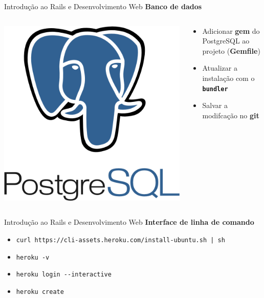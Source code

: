 \documentclass[10pt]{beamer}
\begin{document}
\begin{frame}{Introdução ao Rails e Desenvolvimento Web}
  \huge
  \textbf{Banco de dados}
  \vfill
  \begin{columns}
    \begin{column}{0.29\textwidth}
      \centering
      \includegraphics[width=\textwidth]{images/postgresql.png}
    \end{column}
    \begin{column}{0.69\textwidth}
      \large
      \begin{itemize}
        \item Adicionar \textbf{gem} do PostgreSQL ao projeto (\textbf{Gemfile})
        \item Atualizar a instalação com o \textbf{\texttt{bundler}}
        \item Salvar a modifcação no \textbf{git}
      \end{itemize}
    \end{column}
  \end{columns}
\end{frame}

\begin{frame}{Introdução ao Rails e Desenvolvimento Web}
  \huge
  \textbf{Interface de linha de comando}
  \vfill
  \large
  \begin{itemize}
    \item \texttt{\footnotesize curl https://cli-assets.heroku.com/install-ubuntu.sh | sh}
    \item \texttt{heroku -v}
    \item \texttt{heroku login -{}-interactive}
    \item \texttt{heroku create}
  \end{itemize}

\end{frame}
\end{document}
